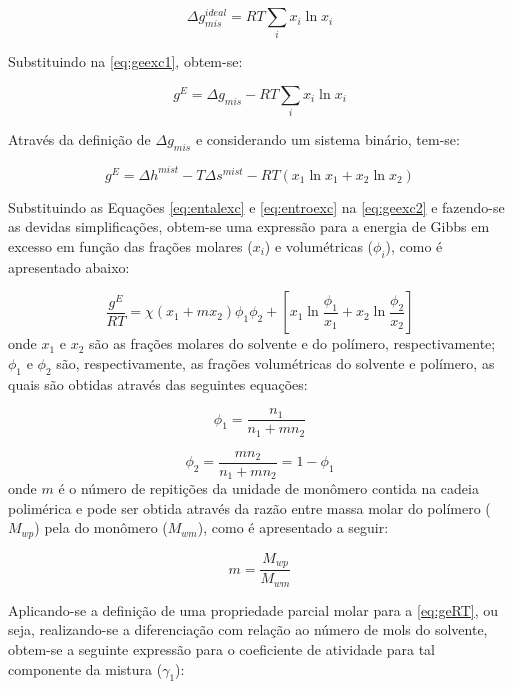 \begin{equation}
\Delta g_{mis}^{ideal} = RT\sum_ix_i\ln x_i
\end{equation}

Substituindo na \autoref{eq:geexc1}, obtem-se:

\begin{equation}
g^E = \Delta g_{mis} - RT\sum_ix_i\ln x_i
\end{equation}

Através da definição de $\Delta g_{mis}$ e considerando um sistema binário,
tem-se:

\begin{equation}\label{eq:geexc2}
g^E = \Delta h^{mist} - T\Delta s^{mist} - RT\left( x_1\ln x_1 + x_2\ln x_2
\right)
\end{equation}

Substituindo as Equações \ref{eq:entalexc} e \ref{eq:entroexc} na
\autoref{eq:geexc2} e fazendo-se as devidas simplificações, obtem-se uma
expressão para a energia de Gibbs em excesso em função das frações molares
($x_i$) e volumétricas ($\phi_i$), como é apresentado abaixo:

\begin{equation}\label{eq:geRT}
\frac{g^E}{RT} = \chi\left(x_1 + mx_2\right)\phi_1\phi_2 +
\left[x_1\ln\frac{\phi_1}{x_1} + x_2\ln\frac{\phi_2}{x_2}\right]
\end{equation}
onde $x_1$ e $x_2$ são as frações molares do solvente e do polímero,
respectivamente; $\phi_1$ e $\phi_2$ são, respectivamente, as frações
volumétricas do solvente e polímero, as quais são obtidas através das
seguintes equações:

\begin{equation}\label{eq:fracvap}
\phi_1 = \frac{n_1}{n_1 + mn_2}
\end{equation}

\begin{equation}
\phi_2 = \frac{mn_2}{n_1 + mn_2} = 1 - \phi_1
\end{equation}
onde $m$ é o número de repitições da unidade de monômero contida na cadeia
polimérica e pode ser obtida através da razão entre massa molar do polímero
($M_{wp}$) pela do monômero ($M_{wm}$), como é apresentado a seguir:

\begin{equation}
m = \frac{M_{wp}}{M_{wm}}
\end{equation}

 Aplicando-se a definição de uma
propriedade parcial molar para a \autoref{eq:geRT}, ou seja, realizando-se a
diferenciação com relação ao número de mols do solvente, obtem-se
a seguinte expressão para o coeficiente de atividade para tal
componente da mistura ($\gamma_1$):


